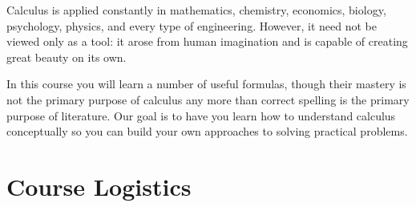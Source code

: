 \documentclass[11pt]{article}
\begin{document}
\begin{description}
  Calculus is applied constantly in mathematics, chemistry, economics,
  biology, psychology, physics, and every type of engineering.
  However, it need not be viewed only as a tool: it arose from human
  imagination and is capable of creating great beauty on its own.

  In this course you will learn a number of useful formulas, though
  their mastery is not the primary purpose of calculus any more than
  correct spelling is the primary purpose of literature. Our goal is
  to have you learn how to understand calculus conceptually so you can
  build your own approaches to solving practical problems.

\end{description}

\section*{Course Logistics}
\end{document}
